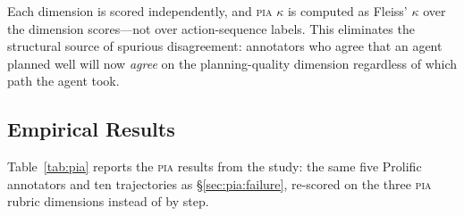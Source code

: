 \documentclass{article}
\newcommand{\PIA}{\textsc{pia}}          %
\begin{document}
Each dimension is scored independently, and \PIA{} $\kappa$ is computed as
Fleiss' $\kappa$ over the dimension scores---not over action-sequence labels.
%
This eliminates the structural source of spurious disagreement: annotators
who agree that an agent planned well will now \emph{agree} on the
planning-quality dimension regardless of which path the agent took.

\subsection{Empirical Results}
\label{sec:pia:results}

Table~\ref{tab:pia} reports the \PIA{} results from the study: the same five
Prolific annotators and ten trajectories as \S\ref{sec:pia:failure},
re-scored on the three \PIA{} rubric dimensions instead of by step.
\end{document}
